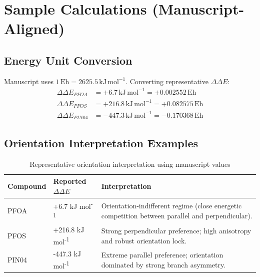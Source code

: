 ﻿\documentclass[11pt]{article}
\begin{document}
\section{Sample Calculations (Manuscript-Aligned)}
\subsection{Energy Unit Conversion}
Manuscript uses \(1\,\mathrm{Eh} = 2625.5\,\mathrm{kJ\,mol^{-1}}\). Converting representative \(\Delta\Delta E\):
\begin{align}
\Delta\Delta E_{PFOA} &= +6.7\,\mathrm{kJ\,mol^{-1}} = +0.002552\,\mathrm{Eh} \\
\Delta\Delta E_{PFOS} &= +216.8\,\mathrm{kJ\,mol^{-1}} = +0.082575\,\mathrm{Eh} \\
\Delta\Delta E_{PIN04} &= -447.3\,\mathrm{kJ\,mol^{-1}} = -0.170368\,\mathrm{Eh}
\end{align}

\subsection{Orientation Interpretation Examples}
\begin{table}[H]
\centering
\caption{Representative orientation interpretation using manuscript values}
\begin{tabular}{p{}p{}p{}}
\toprule
Compound & Reported \(\Delta\Delta E\) & Interpretation \\
\midrule
PFOA & +6.7 kJ mol\textsuperscript{-1} & Orientation-indifferent regime (close energetic competition between parallel and perpendicular). \\
PFOS & +216.8 kJ mol\textsuperscript{-1} & Strong perpendicular preference; high anisotropy and robust orientation lock. \\
PIN04 & -447.3 kJ mol\textsuperscript{-1} & Extreme parallel preference; orientation dominated by strong branch asymmetry. \\
\bottomrule
\end{tabular}
\end{table}
\end{document}
